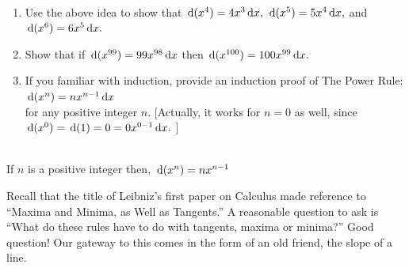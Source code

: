 \begin{embeddedproblem}{}\ \\
  \begin{enumerate}
  \item Use the above idea to show that $\thinspace{\rm d}(x^4)=4x^3\thinspace{\rm d}x,$   $\thinspace{\rm d}(x^5)=5x^4\thinspace{\rm d}x,$ and  $\thinspace{\rm d}(x^6)=6x^5\thinspace{\rm d}x.$
  \item Show that if $\thinspace{\rm d}(x^{99})=99x^{98}\thinspace{\rm d}x$ then $\thinspace{\rm d}(x^{100})=100x^{99}\thinspace{\rm d}x.$
  \item If you familiar with induction, provide an induction proof
    of The Power Rule: $\thinspace{\rm d}(x^n)=nx^{n-1}\thinspace{\rm d}x$ \\
    for any positive integer $n.$  [Actually,
    it works for $n=0$ as well, since $\thinspace{\rm d}(x^0)=\thinspace{\rm d}(1)=0=0 x^{0-1}\thinspace{\rm d}x.$ ]
  \end{enumerate}
\end{embeddedproblem}

\\
If $n$ is a positive integer then, $\thinspace{\rm d}(x^n)=nx^{n-1}$

Recall that the title of Leibniz's first paper on Calculus made
reference to ``Maxima and Minima, as Well as Tangents.'' A reasonable
question to  ask is ``What do these rules have to do with tangents,
maxima or minima?''  Good question!  Our gateway to this
comes in the form of an old friend, the slope of a line. 






